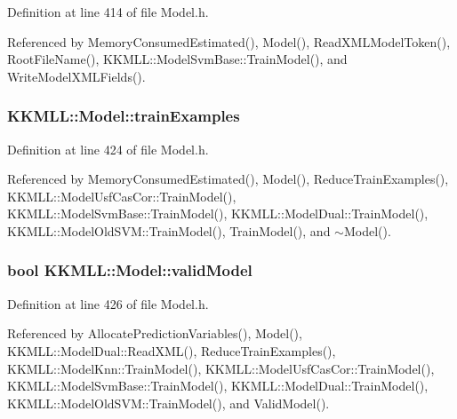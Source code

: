 Definition at line 414 of file Model.\+h.



Referenced by Memory\+Consumed\+Estimated(), Model(), Read\+X\+M\+L\+Model\+Token(), Root\+File\+Name(), K\+K\+M\+L\+L\+::\+Model\+Svm\+Base\+::\+Train\+Model(), and Write\+Model\+X\+M\+L\+Fields().

\subsubsection[{\texorpdfstring{train\+Examples}{trainExamples}}]{ K\+K\+M\+L\+L\+::\+Model\+::train\+Examples\hspace{0.3cm}{\ttfamily [protected]}}\hypertarget{class_k_k_m_l_l_1_1_model_a49f61d35489e1782cd31858fd0082f8e}{}\label{class_k_k_m_l_l_1_1_model_a49f61d35489e1782cd31858fd0082f8e}


Definition at line 424 of file Model.\+h.



Referenced by Memory\+Consumed\+Estimated(), Model(), Reduce\+Train\+Examples(), K\+K\+M\+L\+L\+::\+Model\+Usf\+Cas\+Cor\+::\+Train\+Model(), K\+K\+M\+L\+L\+::\+Model\+Svm\+Base\+::\+Train\+Model(), K\+K\+M\+L\+L\+::\+Model\+Dual\+::\+Train\+Model(), K\+K\+M\+L\+L\+::\+Model\+Old\+S\+V\+M\+::\+Train\+Model(), Train\+Model(), and $\sim$\+Model().

\subsubsection[{\texorpdfstring{valid\+Model}{validModel}}]{\setlength{\rightskip}{0pt plus 5cm}bool K\+K\+M\+L\+L\+::\+Model\+::valid\+Model\hspace{0.3cm}{\ttfamily [protected]}}\hypertarget{class_k_k_m_l_l_1_1_model_af881a051b703412686fa3b4a62b6d68a}{}\label{class_k_k_m_l_l_1_1_model_af881a051b703412686fa3b4a62b6d68a}


Definition at line 426 of file Model.\+h.



Referenced by Allocate\+Prediction\+Variables(), Model(), K\+K\+M\+L\+L\+::\+Model\+Dual\+::\+Read\+X\+M\+L(), Reduce\+Train\+Examples(), K\+K\+M\+L\+L\+::\+Model\+Knn\+::\+Train\+Model(), K\+K\+M\+L\+L\+::\+Model\+Usf\+Cas\+Cor\+::\+Train\+Model(), K\+K\+M\+L\+L\+::\+Model\+Svm\+Base\+::\+Train\+Model(), K\+K\+M\+L\+L\+::\+Model\+Dual\+::\+Train\+Model(), K\+K\+M\+L\+L\+::\+Model\+Old\+S\+V\+M\+::\+Train\+Model(), and Valid\+Model().

